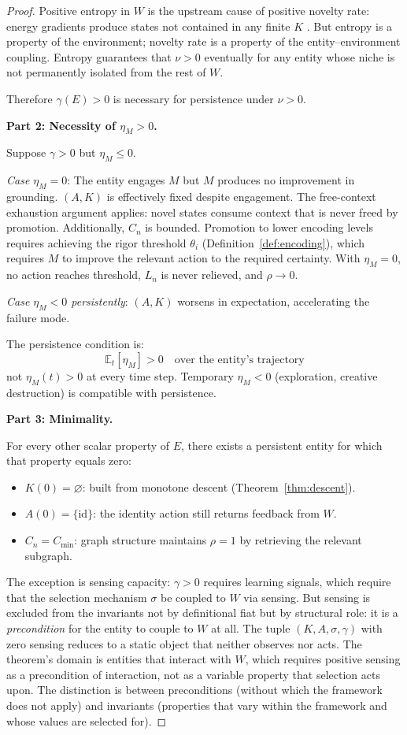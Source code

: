 \documentclass[11pt]{article}
\theoremstyle{definition}
\theoremstyle{remark}
\begin{document}
\begin{proof}
Positive entropy in $W$ is the upstream cause of positive novelty rate:
energy gradients produce states not contained in any finite $K$
\cite{Cover2006, Ashby1956}. But entropy is a property of the
environment; novelty rate is a property of the entity--environment
coupling. Entropy guarantees that $\nu > 0$ eventually for any entity
whose niche is not permanently isolated from the rest of $W$.

Therefore $\gamma(E) > 0$ is necessary for persistence under $\nu > 0$.

\medskip
\textbf{Part 2: Necessity of $\eta_M > 0$.}

Suppose $\gamma > 0$ but $\eta_M \leq 0$.

\emph{Case $\eta_M = 0$}: The entity engages $M$ but $M$ produces no
improvement in grounding. $(A, K)$ is effectively fixed despite
engagement. The free-context exhaustion argument applies: novel states
consume context that is never freed by promotion. Additionally, $C_n$ is
bounded. Promotion to lower encoding levels requires achieving
the rigor threshold $\theta_i$ (Definition~\ref{def:encoding}), which
requires $M$ to improve the relevant action to the required certainty.
With $\eta_M = 0$, no action reaches threshold, $L_n$ is never
relieved, and $\rho \to 0$.

\emph{Case $\eta_M < 0$ persistently}: $(A, K)$ worsens in expectation,
accelerating the failure mode.

The persistence condition is:
\[
\mathbb{E}_t[\eta_M] > 0 \quad \text{over the entity's trajectory}
\]
not $\eta_M(t) > 0$ at every time step. Temporary $\eta_M < 0$
(exploration, creative destruction) is compatible with persistence.

\medskip
\textbf{Part 3: Minimality.}

For every other scalar property of $E$, there exists a persistent
entity for which that property equals zero:
\begin{itemize}
\item $K(0) = \varnothing$: built from monotone descent
      (Theorem~\ref{thm:descent}).
\item $A(0) = \{\mathrm{id}\}$: the identity action still returns
      feedback from $W$.
\item $C_n = C_{\min}$: graph structure \cite{McCarthy2026a}
      maintains $\rho = 1$ by retrieving the relevant subgraph.
\end{itemize}

The exception is sensing capacity: $\gamma > 0$ requires learning
signals, which require that the selection mechanism $\sigma$ be coupled
to $W$ via sensing. But sensing is excluded from the invariants not by
definitional fiat but by structural role: it is a \emph{precondition}
for the entity to couple to $W$ at all. The tuple $(K, A, \sigma,
\gamma)$ with zero sensing reduces to a static object that neither
observes nor acts. The theorem's domain is entities that interact with
$W$, which requires positive sensing as a precondition of interaction,
not as a variable property that selection acts upon. The distinction is between
preconditions (without which the framework does not apply) and
invariants (properties that vary within the framework and whose values
are selected for).


\end{proof}
\end{document}
